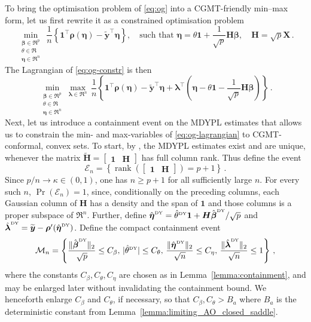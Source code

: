 \documentclass{article}
\makeatletter
\theoremstyle{definition}
\newcommand{\vnorm}[1]{%
	\ensuremath{%
		\if@display
		\left\| #1 \right\|
		\else
		\| #1 \|
		\fi
	}%
}
\newcommand{\abs}[1]{%
	\ensuremath{%
		\if@display
		\left| #1 \right|
		\else
		\lvert #1 \rvert
		\fi
	}%
}
\newcommand*{\bb}{\boldsymbol}
\newcommand{\betady}{\ensuremath{\hat{\bbeta}^{\textrm{\tiny DY}}}}
\newcommand{\etady}{\ensuremath{\hat{\bb{\eta}}^{\textrm{\tiny DY}}}}
\newcommand{\thetady}{\ensuremath{\hat{\theta}^{\textrm{\tiny DY}}}}
\def\bH {\bb{H}}
\def\bX{\bb{X}}
\def\bYtil{\widetilde{\bb{y}}}
\def\bbeta{\bb{\beta}}
\def\bH{\bb{H}}
\def\blambda{\bb{\lambda}}
\newcommand{\rank}{\operatorname{rank}}
\makeatother
\begin{document}
\begin{bibunit}
To bring the optimisation problem of \eqref{eq:og} into a CGMT-friendly min--max form, let us first rewrite it as a constrained optimisation problem
\begin{equation}
	\label{eq:og-constr}
	\underset{\substack{\bbeta \in \Re^p \\ \theta \in \Re \\ \bb \eta \in \Re^n}}{\min} \, \frac{1}{n} \left\{ \bb 1^\top \bb \rho(\bb{\eta}) - \bYtil^\top \bb{\eta} \right\}, \quad \textrm{such that } \bb{\eta} = \theta \bb 1 + \frac{1}{\sqrt{p}} \bH \bbeta, \quad \bH = \sqrt{p} \bX \,.
\end{equation}
The Lagrangian of \eqref{eq:og-constr} is then
\begin{equation}
	\label{eq:og-lagrangian}
	\underset{\substack{\bbeta \in \Re^p \\ \theta \in \Re \\ \bb \eta \in \Re^n}}{\min} \underset{\bb \lambda \in \Re^n}{\max} \, \frac{1}{n} \left\{ \bb 1^\top \bb \rho(\bb{\eta}) - \bYtil^\top \bb{\eta} + \bb \lambda^\top \left(\bb{\eta} - \theta \bb 1 - \frac{1}{\sqrt{p}}\bH \bbeta \right)\right\} \,.
\end{equation}
Next, let us introduce a containment event on the MDYPL estimates that allows us to constrain the min- and max-variables of \eqref{eq:og-lagrangian} to CGMT-conformal, convex sets.
To start, by \citet[][Theorem~1]{rigon+aliverti:2023}, the MDYPL estimates exist and are unique, whenever the matrix $\widetilde{\bH} = \begin{bmatrix}
	\bb 1 & \bH
	\end{bmatrix}$ has full column rank. Thus define the event
\begin{equation}
	\label{event:E_n}
	\mathcal{E}_n = \left\{ \rank\left(\begin{bmatrix}
	\bb 1 & \bH
	\end{bmatrix}\right) = p + 1 \right\} \,.
\end{equation}
Since $p/n\to\kappa\in(0,1)$, one has $n\geq p+1$ for all sufficiently
large $n$. For every such $n$, $\Pr(\mathcal E_n)=1$, since, conditionally
on the preceding columns, each Gaussian column of $\bH$ has a density and
the span of $\bb1$ and those columns is a proper subspace of $\Re^n$.
Further, define $\etady = \thetady \bb 1 + \bH \betady / \sqrt{p}$ and $\hat{\blambda}^{\textrm{\tiny DY}} = \bYtil - \bb \rho'(\etady)$.
Define the compact containment event
\begin{equation}
	\label{event:M_n}
		\mathcal{M}_n
	=
	\left\{
		\frac{\vnorm{\betady}_2}{\sqrt p} \leq C_\beta,\,
		\abs{\thetady} \leq C_\theta,\,
		\frac{\vnorm{\etady}_2}{\sqrt n} \leq C_\eta,\,
		\frac{\vnorm{\hat{\blambda}^{\textrm{\tiny DY}}}_2}{\sqrt n} \leq 1
	\right\} \,,
\end{equation}
where the constants $C_\beta,C_\theta,C_\eta$ are chosen as in
Lemma~\ref{lemma:containment}, and may be enlarged later without invalidating
the containment bound.
We henceforth enlarge $C_\beta$ and $C_\theta$, if
necessary, so that $C_\beta, C_\theta>B_a$
where $B_a$ is the deterministic constant from
Lemma~\ref{lemma:limiting_AO_closed_saddle}.



\end{bibunit}
\end{document}
